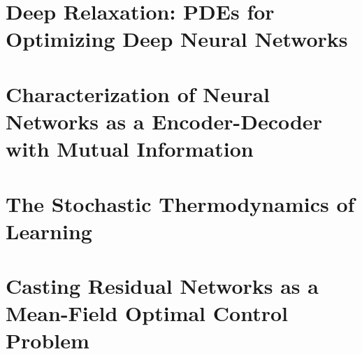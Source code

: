 \cite{blackbox} \cite{deeprelaxation} \cite{meanfield}


\section{Deep Relaxation: PDEs for Optimizing Deep Neural Networks}
\section{Characterization of Neural Networks as a Encoder-Decoder with Mutual Information}
\section{The Stochastic Thermodynamics of Learning}
\section{Casting Residual Networks as a Mean-Field Optimal Control Problem}
